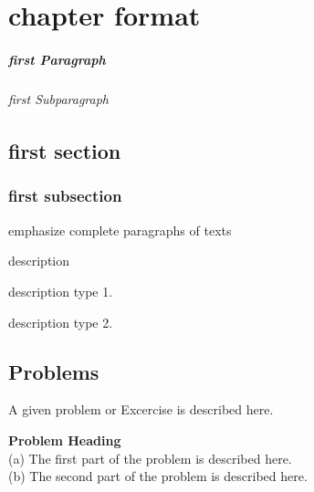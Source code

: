 %
%
%
\chapter{chapter format}
\label{ch_format} %
\paragraph{first Paragraph}
\subparagraph{first Subparagraph} 
\section{first section}
\label{first_section} %
\subsection{first subsection}

\begin{svgraybox}
	emphasize complete paragraphs of texts 
\end{svgraybox}

description

\begin{description}[Type 1]
	\item[Type 1]{description type 1.}
	\item[Type 2]{description type 2.}
\end{description}

\section*{Problems}
%
\begin{prob}
	\label{prob1}
	A given problem or Excercise is described here. 
\end{prob}

\begin{prob}
	\label{prob2}
	\textbf{Problem Heading}\\
	(a) The first part of the problem is described here.\\
	(b) The second part of the problem is described here.
\end{prob}


